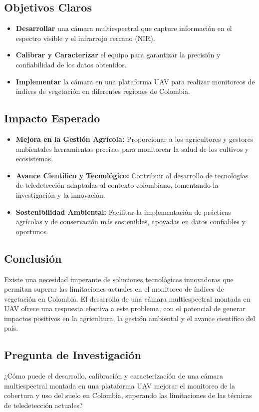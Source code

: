 \subsection*{Objetivos Claros}

\begin{itemize}
    \item \textbf{Desarrollar} una cámara multiespectral que capture información en el espectro visible y el infrarrojo cercano (NIR).

    \item \textbf{Calibrar y Caracterizar} el equipo para garantizar la precisión y confiabilidad de los datos obtenidos.

    \item \textbf{Implementar} la cámara en una plataforma UAV para realizar monitoreos de índices de vegetación en diferentes regiones de Colombia.
\end{itemize}

\subsection*{Impacto Esperado}

\begin{itemize}
    \item \textbf{Mejora en la Gestión Agrícola:} Proporcionar a los agricultores y gestores ambientales herramientas precisas para monitorear la salud de los cultivos y ecosistemas.

    \item \textbf{Avance Científico y Tecnológico:} Contribuir al desarrollo de tecnologías de teledetección adaptadas al contexto colombiano, fomentando la investigación y la innovación.

    \item \textbf{Sostenibilidad Ambiental:} Facilitar la implementación de prácticas agrícolas y de conservación más sostenibles, apoyadas en datos confiables y oportunos.
\end{itemize}

\subsection*{Conclusión}

Existe una necesidad imperante de soluciones tecnológicas innovadoras que permitan superar las limitaciones actuales en el monitoreo de índices de vegetación en Colombia. El desarrollo de una cámara multiespectral montada en UAV ofrece una respuesta efectiva a este problema, con el potencial de generar impactos positivos en la agricultura, la gestión ambiental y el avance científico del país.

\subsection*{Pregunta de Investigación}

¿Cómo puede el desarrollo, calibración y caracterización de una cámara multiespectral montada en una plataforma UAV mejorar el monitoreo de la cobertura y uso del suelo en Colombia, superando las limitaciones de las técnicas de teledetección actuales?


